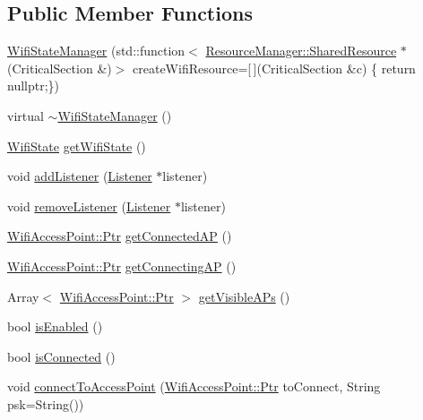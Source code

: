 \subsection*{Public Member Functions}
\begin{DoxyCompactItemize}
\item 
\mbox{\hyperlink{classWifiStateManager_a27e7eb52797c9af40f97b8c760d4d33c}{Wifi\+State\+Manager}} (std\+::function$<$ \mbox{\hyperlink{classResourceManager_1_1SharedResource}{Resource\+Manager\+::\+Shared\+Resource}} $\ast$(Critical\+Section \&)$>$ create\+Wifi\+Resource=\mbox{[}$\,$\mbox{]}(Critical\+Section \&c) \{ return nullptr;\})
\item 
virtual \mbox{\hyperlink{classWifiStateManager_ac9f8d530dd059cf2acc357d2e3aadc83}{$\sim$\+Wifi\+State\+Manager}} ()
\item 
\mbox{\hyperlink{classWifiStateManager_a1b2ed840606c57c43d4a147c96d43128}{Wifi\+State}} \mbox{\hyperlink{classWifiStateManager_a204b08dd7e75bf62cbf3eccf51acda8e}{get\+Wifi\+State}} ()
\item 
void \mbox{\hyperlink{classWifiStateManager_ac4262cfae2045cef25443fd8dddcd1b3}{add\+Listener}} (\mbox{\hyperlink{classWifiStateManager_1_1Listener}{Listener}} $\ast$listener)
\item 
void \mbox{\hyperlink{classWifiStateManager_aad72d9ce616be466679c52188662d8bb}{remove\+Listener}} (\mbox{\hyperlink{classWifiStateManager_1_1Listener}{Listener}} $\ast$listener)
\item 
\mbox{\hyperlink{classWifiAccessPoint_ad18977f884076774803027efbaa131a0}{Wifi\+Access\+Point\+::\+Ptr}} \mbox{\hyperlink{classWifiStateManager_aaaef8257edc65b1a44e5ab81640d7cd1}{get\+Connected\+AP}} ()
\item 
\mbox{\hyperlink{classWifiAccessPoint_ad18977f884076774803027efbaa131a0}{Wifi\+Access\+Point\+::\+Ptr}} \mbox{\hyperlink{classWifiStateManager_afb6ba1a34390127a1d4b395f06f1cef4}{get\+Connecting\+AP}} ()
\item 
Array$<$ \mbox{\hyperlink{classWifiAccessPoint_ad18977f884076774803027efbaa131a0}{Wifi\+Access\+Point\+::\+Ptr}} $>$ \mbox{\hyperlink{classWifiStateManager_a8347f0efd28a3e53cf645e28fa2be10b}{get\+Visible\+A\+Ps}} ()
\item 
bool \mbox{\hyperlink{classWifiStateManager_afff012e5d9055c9fe03ff448bdc215aa}{is\+Enabled}} ()
\item 
bool \mbox{\hyperlink{classWifiStateManager_a511a634fb6d9744a6c0c94d9171c9b5c}{is\+Connected}} ()
\item 
void \mbox{\hyperlink{classWifiStateManager_adb3614524ad42b6d21dc394d6ce0c344}{connect\+To\+Access\+Point}} (\mbox{\hyperlink{classWifiAccessPoint_ad18977f884076774803027efbaa131a0}{Wifi\+Access\+Point\+::\+Ptr}} to\+Connect, String psk=String())

\end{DoxyCompactItemize}
